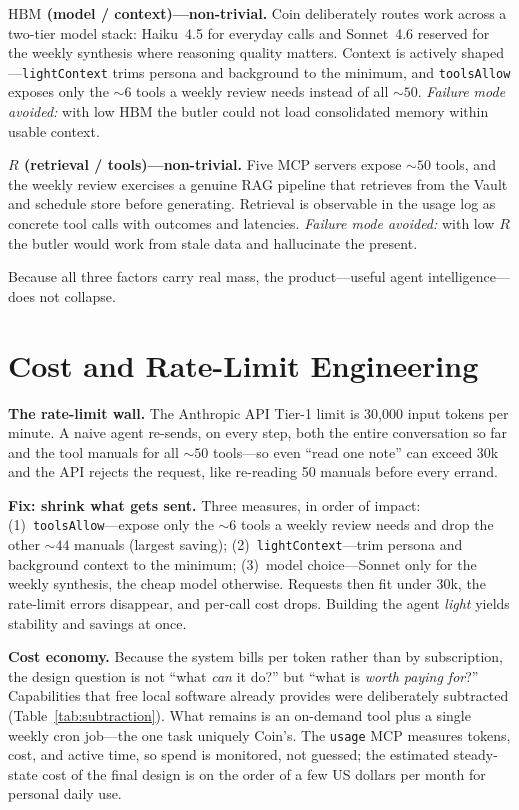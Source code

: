 \documentclass[conference]{IEEEtran}
\begin{document}
\textbf{$\mathrm{HBM}$ (model / context)---non-trivial.} Coin deliberately routes
work across a two-tier model stack: Haiku~4.5 for everyday calls and Sonnet~4.6
reserved for the weekly synthesis where reasoning quality matters. Context is
actively shaped---\texttt{lightContext} trims persona and background to the
minimum, and \texttt{toolsAllow} exposes only the ${\sim}6$ tools a weekly review
needs instead of all ${\sim}50$. \emph{Failure mode avoided:} with low
$\mathrm{HBM}$ the butler could not load consolidated memory within usable context.

\textbf{$R$ (retrieval / tools)---non-trivial.} Five MCP servers expose ${\sim}50$
tools, and the weekly review exercises a genuine RAG pipeline that retrieves from
the Vault and schedule store before generating. Retrieval is observable in the
usage log as concrete tool calls with outcomes and latencies. \emph{Failure mode
avoided:} with low $R$ the butler would work from stale data and hallucinate the
present.

Because all three factors carry real mass, the product---useful agent
intelligence---does not collapse.

\section{Cost and Rate-Limit Engineering}
\textbf{The rate-limit wall.} The Anthropic API Tier-1 limit is 30{,}000 input
tokens per minute. A naive agent re-sends, on every step, both the entire
conversation so far and the tool manuals for all ${\sim}50$ tools---so even ``read
one note'' can exceed 30k and the API rejects the request, like re-reading 50
manuals before every errand.

\textbf{Fix: shrink what gets sent.} Three measures, in order of impact:
(1)~\texttt{toolsAllow}---expose only the ${\sim}6$ tools a weekly review needs and
drop the other ${\sim}44$ manuals (largest saving);
(2)~\texttt{lightContext}---trim persona and background context to the minimum;
(3)~model choice---Sonnet only for the weekly synthesis, the cheap model
otherwise. Requests then fit under 30k, the rate-limit errors disappear, and
per-call cost drops. Building the agent \emph{light} yields stability and savings
at once.

\textbf{Cost economy.} Because the system bills per token rather than by
subscription, the design question is not ``what \emph{can} it do?'' but ``what is
\emph{worth paying for}?'' Capabilities that free local software already provides
were deliberately subtracted (Table~\ref{tab:subtraction}). What remains is an
on-demand tool plus a single weekly cron job---the one task uniquely Coin's. The
\texttt{usage} MCP measures tokens, cost, and active time, so spend is monitored,
not guessed; the estimated steady-state cost of the final design is on the order of
a few US dollars per month for personal daily use.
\end{document}
